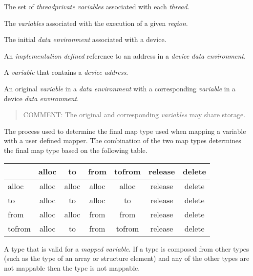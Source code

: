 \glossarydefstart
The set of \emph{threadprivate variables} associated with each \emph{thread}.
\glossarydefend

\glossarydefstart
The \emph{variables} associated with the execution of a given \emph{region}.
\glossarydefend

\glossarydefstart
The initial \emph{data environment} associated with a device.
\glossarydefend
\bigskip

\glossarydefstart
An \emph{implementation defined} reference to an address in a \emph{device
  data environment}.
\glossarydefend

\glossarydefstart
A \emph{variable} that contains a \emph{device address}.
\glossarydefend


\glossarydefstart
An original \emph{variable} in a \emph{data environment} with a corresponding \emph{variable} in a
device \emph{data environment}.

\begin{quote}
COMMENT: The original and corresponding \emph{variables} may share storage.
\end{quote}
\glossarydefend

\glossarydefstart
The process used to determine the final map type used when mapping a variable
with a user defined mapper.  The combination of the two map types determines the
final map type based on the following table.

\begin{tabular}{l|c|c|c|c|c|c}
  & alloc & to    & from  & tofrom & release & delete \\
  \hline
alloc  & alloc & alloc & alloc & alloc  & release & delete \\
to     & alloc & to    & alloc & to     & release & delete \\
from   & alloc & alloc & from  & from   & release & delete \\
tofrom & alloc & to    & from  & tofrom & release & delete \\
\end{tabular}
\vspace{2ex} %
\glossarydefend

\glossarydefstart
A type that is valid for a \emph{mapped variable}. If a type is composed from other types
(such as the type of an array or structure element) and any of the other types are
not mappable then the type is not mappable.

